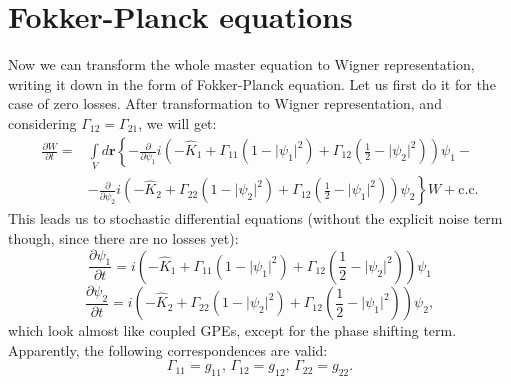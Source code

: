 \documentclass[12pt,notitlepage]{report}
\begin{document}
\section{Fokker-Planck equations}

Now we can transform the whole master equation to Wigner representation, writing it down in the form of Fokker-Planck equation.
Let us first do it for the case of zero losses.
After transformation to Wigner representation, and considering $\Gamma_{12} = \Gamma_{21} $, we will get:
\begin{equation*}
\begin{split}
\frac{\partial W}{\partial t} = & \int\limits_V d\mathbf{r} \left\{ - \frac{\partial}{\partial \psi_1} i \left( - \hat{K}_1 +
\Gamma_{11} \left( 1 - \lvert \psi_1 \rvert^2 \right) +
\Gamma_{12} \left( \frac{1}{2} - \lvert \psi_2 \rvert^2 \right) \right) \psi_1 - \right. \\
& \left. - \frac{\partial}{\partial \psi_2} i \left( - \hat{K}_2 + \Gamma_{22} \left( 1 - \lvert \psi_2 \rvert^2 \right) +
\Gamma_{12} \left( \frac{1}{2} - \lvert \psi_1 \rvert^2 \right) \right) \psi_2 \right\} W +
\textrm{c.c.}
\end{split}
\end{equation*}
This leads us to stochastic differential equations (without the explicit noise term though, since there are no losses yet):
\[
\frac{\partial \psi_1}{\partial t} = i \left( - \hat{K}_1 + \Gamma_{11} \left( 1 - \lvert \psi_1 \rvert^2 \right) +
\Gamma_{12} \left( \frac{1}{2} - \lvert \psi_2 \rvert^2 \right) \right) \psi_1
\]
\[
\frac{\partial \psi_2}{\partial t} = i \left( - \hat{K}_2 + \Gamma_{22} \left( 1 - \lvert \psi_2 \rvert^2 \right) +
\Gamma_{12} \left( \frac{1}{2} - \lvert \psi_1 \rvert^2 \right) \right) \psi_2,
\]
which look almost like coupled GPEs, except for the phase shifting term.
Apparently, the following correspondences are valid:
\[
\Gamma_{11} = g_{11},\, \Gamma_{12} = g_{12},\, \Gamma_{22} = g_{22}.
\]
\end{document}
